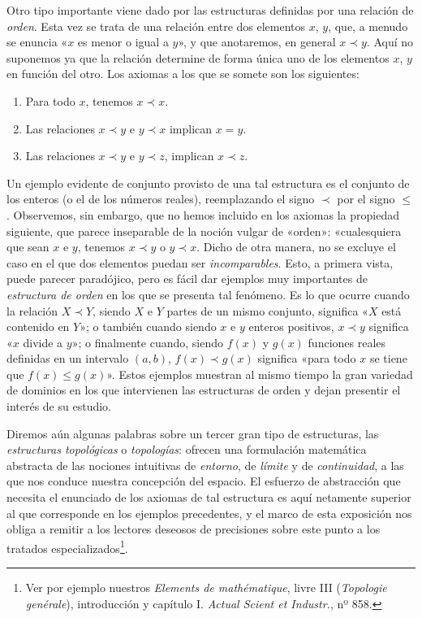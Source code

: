 \documentclass[a4paper, 12pt, draft]{article}
\begin{document}
Otro tipo importante viene dado por las estructuras definidas por una relación de \textit{orden}. Esta vez se trata de una relación entre dos elementos $x$, $y$, que, a menudo se enuncia «$x$ es menor o igual a $y$», y que anotaremos, en general $ x \prec y$. Aquí no suponemos ya que la relación determine de forma única uno de los elementos $x$, $y$ en función del otro. Los axiomas a los que se somete son los siguientes: 

\begin{enumerate}[\indent a)]
\vspace{- 1em}

\item Para todo $x$, tenemos $x \prec x$.

\item Las relaciones $x \prec y$ e $y \prec x$ implican $x=y$.

\item Las relaciones $x\prec y$ e $y\prec z$, implican $x\prec z$. 

 \end{enumerate}

 Un ejemplo evidente de conjunto provisto de una tal estructura es el conjunto de los enteros (o el de los números reales), reemplazando el signo $\prec$ por el signo $\le $. Observemos, sin embargo, que no hemos incluido en los axiomas la propiedad siguiente, que parece inseparable de la noción vulgar de «orden»: «cualesquiera que sean $x$ e $y$, tenemos $ x \prec y$ o $y \prec x$. Dicho de otra manera, no se excluye el caso en el que dos elementos puedan ser \textit{incomparables}. Esto, a primera vista, puede parecer paradójico, pero es fácil dar ejemplos muy importantes de \textit{estructura de orden} en los que se presenta tal fenómeno. Es lo que ocurre cuando la relación $ X \prec Y$, siendo $X$ e $Y$ partes de un mismo conjunto, significa «$X$ está contenido en $Y$»; o también cuando siendo $x$ e $y$ enteros positivos, $x \prec y$ significa «$x$ divide a $y$»; o finalmente cuando, siendo $f(x)$ y $g(x)$ funciones reales definidas en un intervalo $(a,b)$, $f(x)\prec g(x)$ significa «para todo $x$ se tiene que $f(x) \le g(x)$». Estos ejemplos muestran al mismo tiempo la gran variedad de dominios en los que intervienen las estructuras de orden y dejan presentir el interés de su estudio.

Diremos aún algunas palabras sobre un tercer gran tipo de estructuras, las \textit{estructuras topológicas} o \textit{topologías}: ofrecen una formulación matemática abstracta de las nociones intuitivas de \textit{entorno}, de \textit{límite} y de \textit{continuidad}, a las que nos conduce nuestra concepción del espacio. El esfuerzo de abstracción que necesita el enunciado de los axiomas de tal estructura es aquí netamente superior al que corresponde en los ejemplos precedentes, y el marco de esta exposición nos obliga a remitir a los lectores deseosos de precisiones sobre este punto a los tratados especializados\footnote{Ver por ejemplo nuestros \textit{Elements de mathématique}, livre III (\textit{Topologie genérale}), introducción y capítulo I.\textit{ Actual Scient et Industr.}, nº 858.}.
\end{document}
